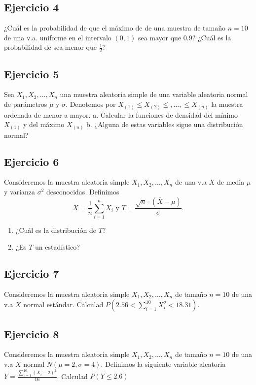 \documentclass[]{article}
\providecommand{\tightlist}{%
  \setlength{\itemsep}{0pt}\setlength{\parskip}{0pt}}
\begin{document}
\hypertarget{ejercicio-4}{%
\subsection{Ejercicio 4}\label{ejercicio-4}}

¿Cuál es la probabilidad de que el máximo de de una muestra de tamaño
\(n=10\) de una v.a. uniforme en el intervalo \((0,1)\) sea mayor que
\(0.9\)? ¿Cuál es la probabilidad de sea menor que \(\frac12\)?

\hypertarget{ejercicio-5}{%
\subsection{Ejercicio 5}\label{ejercicio-5}}

Sea \(X_1,X_2,\ldots,X_n\) una muestra aleatoria simple de una variable
aleatoria normal de parámetros \(\mu\) y \(\sigma\). Denotemos por
\(X_{(1)}\leq X_{(2)}\leq ,\ldots,\leq X_{(n)}\) la muestra ordenada de
menor a mayor. a. Calcular la funciones de densidad del mínimo
\(X_{(1)}\) y del máximo \(X_{(n)}\) b. ¿Alguna de estas variables sigue
una distribución normal?

\hypertarget{ejercicio-6}{%
\subsection{Ejercicio 6}\label{ejercicio-6}}

Consideremos la muestra aleatoria simple \(X_1,X_2,\ldots,X_n\) de una
v.a \(X\) de media \(\mu\) y varianza \(\sigma^2\) desconocidas.
Definimos
\[\overline{X}=\frac1n \sum\limits_{i=1}^n X_i\mbox{ y } T=\frac{\sqrt{n}\cdot(\overline{X}-\mu)}{\sigma}.\]

\begin{enumerate}
\def\labelenumi{\alph{enumi}.}
\tightlist
\item
  ¿Cuál es la distribución de \(T\)?
\item
  ¿Es \(T\) un estadístico?
\end{enumerate}

\hypertarget{ejercicio-7}{%
\subsection{Ejercicio 7}\label{ejercicio-7}}

Consideremos la muestra aleatoria simple \(X_1,X_2,\ldots,X_n\) de
tamaño \(n=10\) de una v.a \(X\) normal estándar. Calculad
\(P\left(2.56<\sum\limits_{i=1}^{10} X_i^2 <18.31\right)\).

\hypertarget{ejercicio-8}{%
\subsection{Ejercicio 8}\label{ejercicio-8}}

Consideremos la muestra aleatoria simple \(X_1,X_2,\ldots,X_{n}\) de
tamaño \(n=10\) de una v.a \(X\) normal \(N(\mu=2,\sigma=4)\). Definimos
la siguiente variable aleatoria
\(Y=\frac{\sum\limits_{i=1}^{10}{(X_i-2)}^2}{16}\). Calculad
\(P(Y\leq 2.6)\)
\end{document}
